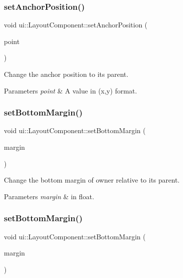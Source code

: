 \subsubsection{\texorpdfstring{set\+Anchor\+Position()}{setAnchorPosition()}\hspace{0.1cm}{\footnotesize\ttfamily [2/2]}}
{\footnotesize\ttfamily void ui\+::\+Layout\+Component\+::set\+Anchor\+Position (\begin{DoxyParamCaption}\item[{const \hyperlink{classVec2}{Point} \&}]{point }\end{DoxyParamCaption})}

Change the anchor position to it\textquotesingle{}s parent. 
\begin{DoxyParams}{Parameters}
{\em point} & A value in (x,y) format. \\
\hline
\end{DoxyParams}
\mbox{\label{classui_1_1LayoutComponent_a8c6be07216609a96c1721308c25e5384}} 
\subsubsection{\texorpdfstring{set\+Bottom\+Margin()}{setBottomMargin()}\hspace{0.1cm}{\footnotesize\ttfamily [1/2]}}
{\footnotesize\ttfamily void ui\+::\+Layout\+Component\+::set\+Bottom\+Margin (\begin{DoxyParamCaption}\item[{float}]{margin }\end{DoxyParamCaption})}

Change the bottom margin of owner relative to its parent. 
\begin{DoxyParams}{Parameters}
{\em margin} & in float. \\
\hline
\end{DoxyParams}
\mbox{\label{classui_1_1LayoutComponent_a8c6be07216609a96c1721308c25e5384}} 
\subsubsection{\texorpdfstring{set\+Bottom\+Margin()}{setBottomMargin()}\hspace{0.1cm}{\footnotesize\ttfamily [2/2]}}
{\footnotesize\ttfamily void ui\+::\+Layout\+Component\+::set\+Bottom\+Margin (\begin{DoxyParamCaption}\item[{float}]{margin }\end{DoxyParamCaption})}

